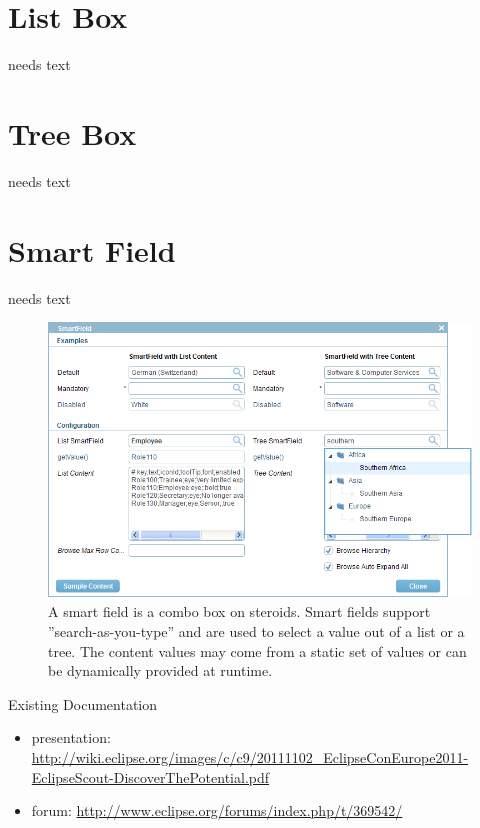 \documentclass[a4paper,10pt,twoside]{book}
\begin{document}
\section{List Box}
needs text

\section{Tree Box}
needs text

\section{Smart Field}
needs text

\begin{figure}
\includegraphics[width=14cm]{smartfield.png}
\caption{A smart field is a combo box on steroids.
Smart fields support ''search-as-you-type'' and are used to select a value out of a list or a tree.
The content values may come from a static set of values or can be dynamically provided at runtime.}
\end{figure}

\noindent Existing Documentation
\begin{itemize}
  \item presentation: \url{http://wiki.eclipse.org/images/c/c9/20111102_EclipseConEurope2011-EclipseScout-DiscoverThePotential.pdf}
  \item forum: \url{http://www.eclipse.org/forums/index.php/t/369542/}
\end{itemize}
\end{document}
